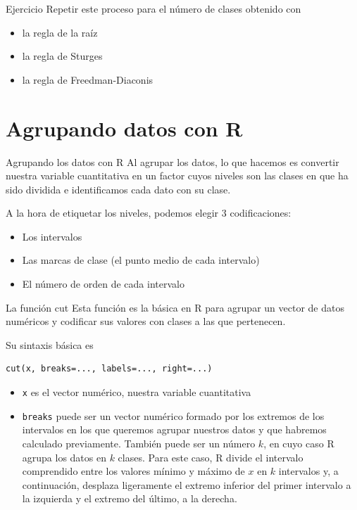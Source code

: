 \documentclass[
  ignorenonframetext,
]{beamer}
\providecommand{\tightlist}{%
  \setlength{\itemsep}{0pt}\setlength{\parskip}{0pt}}
\begin{document}
\begin{frame}{Ejercicio}
\label{ejercicio}
Repetir este proceso para el número de clases obtenido con

\begin{itemize}
\tightlist
\item
  la regla de la raíz
\item
  la regla de Sturges
\item
  la regla de Freedman-Diaconis
\end{itemize}
\end{frame}

\section{Agrupando datos con R}\label{agrupando-datos-con-r}

\begin{frame}{Agrupando los datos con R}
\label{agrupando-los-datos-con-r}
Al agrupar los datos, lo que hacemos es convertir nuestra variable
cuantitativa en un factor cuyos niveles son las clases en que ha sido
dividida e identificamos cada dato con su clase.

A la hora de etiquetar los niveles, podemos elegir 3 codificaciones:

\begin{itemize}
\tightlist
\item
  Los intervalos
\item
  Las marcas de clase (el punto medio de cada intervalo)
\item
  El número de orden de cada intervalo
\end{itemize}
\end{frame}

\begin{frame}[fragile]{La función cut}
\label{la-funciuxf3n-cut}
Esta función es la básica en R para agrupar un vector de datos numéricos
y codificar sus valores con clases a las que pertenecen.

Su sintaxis básica es

\begin{verbatim}
cut(x, breaks=..., labels=..., right=...)
\end{verbatim}

\begin{itemize}
\tightlist
\item
  \texttt{x} es el vector numérico, nuestra variable cuantitativa
\item
  \texttt{breaks} puede ser un vector numérico formado por los extremos
  de los intervalos en los que queremos agrupar nuestros datos y que
  habremos calculado previamente. También puede ser un número \(k\), en
  cuyo caso R agrupa los datos en \(k\) clases. Para este caso, R divide
  el intervalo comprendido entre los valores mínimo y máximo de \(x\) en
  \(k\) intervalos y, a continuación, desplaza ligeramente el extremo
  inferior del primer intervalo a la izquierda y el extremo del último,
  a la derecha.
\end{itemize}
\end{frame}
\end{document}
